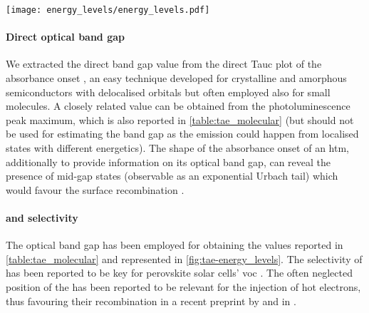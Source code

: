 	\begin{SCfigure}
		\centering
		\texttt{[image: energy\_levels/energy\_levels.pdf]}
		\label{fig:tae-energy_levels}
	\end{SCfigure}

	\paragraph{Direct optical band gap}
	We extracted the direct band gap value from the direct Tauc plot of the absorbance onset \cite{WikipediaTauc}, an easy technique developed for crystalline and amorphous semiconductors \cite{Stenzel2005} with delocalised orbitals but often employed also for small molecules.
	A closely related value can be obtained from the photoluminescence peak maximum, which is also reported in \cref{table:tae_molecular} (but should not be used for estimating the band gap as the emission could happen from localised states with different energetics).
	The shape of the absorbance onset of an \gls{htm}, additionally to provide information on its optical band gap, can reveal the presence of mid-gap states (observable as an exponential Urbach tail) which would favour the surface recombination \cite{Tvingstedt2017}.
	
	\paragraph{ and selectivity}
		The optical band gap has been employed for obtaining the  values reported in \cref{table:tae_molecular} and represented in \cref{fig:tae-energy_levels}.
		The selectivity of  has been reported to be key for perovskite solar cells' \gls{voc} \cite{Stolterfoht2018a}.
		The often neglected position of the   has been reported to be relevant for the injection of hot electrons, thus favouring their recombination in a recent preprint by  and in .
		
